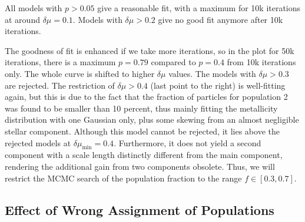 All models with $p>0.05$ give a reasonable fit, with a maximum for 10k
iterations at around $\delta \mu = 0.1$. Models with $\delta \mu>0.2$
give no good fit anymore after 10k iterations.

The goodness of fit is enhanced if we take more iterations, so in the
plot for 50k iterations, there is a maximum $p=0.79$ compared to
$p=0.4$ from 10k iterations only. The whole curve is shifted to higher
$\delta \mu$ values. The models with $\delta \mu>0.3$ are
rejected. The restriction of $\delta \mu>0.4$ (last point to the
right) is well-fitting again, but this is due to the fact that the
fraction of particles for population 2 was found to be smaller than 10
percent, thus mainly fitting the metallicity distribution with one
Gaussian only, plus some skewing from an almost negligible stellar
component. Although this model cannot be rejected, it lies above the
rejected models at $\delta\mu_{\min}=0.4$. Furthermore, it does not
yield a second component with a scale length distinctly different from
the main component, rendering the additional gain from two components
obsolete. Thus, we will restrict the MCMC search of the population
fraction to the range $f\in[0.3,0.7]$.






\subsection{Effect of Wrong Assignment of Populations}
